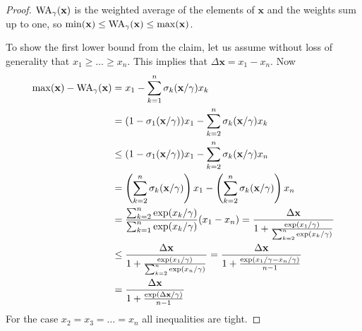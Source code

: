 \begin{proof}
 \(\operatorname{WA}_\gamma(\mathbf{x})\) is the weighted average of the elements of \(\mathbf{x}\) and the weights sum up to one, so 
 \(\min(\mathbf{x}) \leq \operatorname{WA}_\gamma(\mathbf{x}) \leq \max(\mathbf{x})\).
 
 To show the first lower bound from the claim, let us assume without loss of generality that \(x_1 \geq \ldots \geq x_n\).
 This implies that \(\Delta \mathbf{x} = x_1 - x_n\).
 Now
 \begin{align*}
   \max(\mathbf{x}) - \operatorname{WA}_\gamma(\mathbf{x}) &= x_1 - \sum_{k=1}^n \sigma_k(\mathbf{x} / \gamma) x_k \\
                                             &= (1 - \sigma_1(\mathbf{x} / \gamma)) x_1 - \sum_{k=2}^n \sigma_k(\mathbf{x} / \gamma) x_k \\
                                             &\leq (1 - \sigma_1(\mathbf{x} / \gamma)) x_1 - \sum_{k=2}^n \sigma_k(\mathbf{x} / \gamma) x_n \\
                                             &= \left({ \sum_{k=2}^n \sigma_k(\mathbf{x} / \gamma) }\right) x_1 - \left({ \sum_{k=2}^n \sigma_k(\mathbf{x} / \gamma) }\right) x_n \\
                                             &= \frac{ \sum_{k=2}^n \exp(x_k / \gamma) }{ \sum_{k=1}^n \exp(x_k / \gamma) } (x_1 - x_n)
                                             = \frac{\Delta \mathbf{x}}{1 + \frac{ \exp(x_1 / \gamma) }{ \sum_{k=2}^n \exp(x_k / \gamma) }} \\
                                             &\leq \frac{\Delta \mathbf{x}}{1 + \frac{ \exp(x_1 / \gamma) }{ \sum_{k=2}^n \exp(x_n / \gamma) }}
                                              = \frac{\Delta \mathbf{x}}{1 + \frac{ \exp(x_1 / \gamma - x_n / \gamma) }{ n - 1 }} \\
                                             &= \frac{\Delta \mathbf{x}}{1 + \frac{ \exp(\Delta \mathbf{x} / \gamma) }{ n - 1 } }
 \end{align*}
 For the case \(x_2 = x_3 = \ldots = x_n\) all inequalities are tight.
 

\end{proof}
